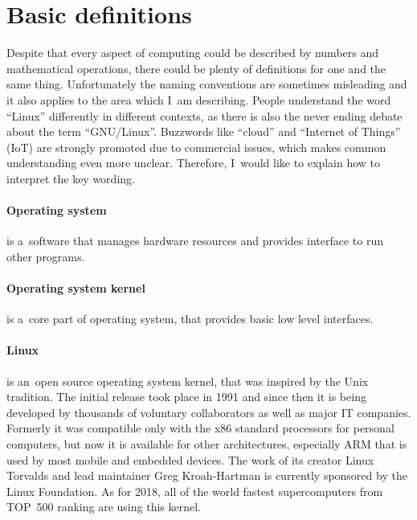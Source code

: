 \documentclass[printmode]{mgr}
\begin{document}
\section{Basic definitions}

Despite that every aspect of computing could be described by numbers and mathematical operations, there could be plenty of definitions for one and the same thing.
Unfortunately the naming conventions are sometimes misleading and it also applies to the area which I~am describing.
People understand the word ``Linux'' differently in different contexts, as there is also the never ending debate about the term ``GNU/Linux''.\cite{web:gnu-linux}
Buzzwords like ``cloud'' and ``Internet of Things'' (IoT) are strongly promoted due to commercial issues, which makes common understanding even more unclear.
Therefore, I~would like to explain how to interpret the key wording.

\paragraph{Operating system} is a~software that manages hardware resources and provides interface to run other programs.\cite{web:def-os}

\paragraph{Operating system kernel} is a~core part of operating system, that provides  basic low level interfaces.\cite{web:def-kernel}

\paragraph{Linux} is an~open source operating system kernel, that was inspired by the Unix tradition. The initial release took place in 1991 and since then it is being developed by thousands of voluntary collaborators as well as major IT companies. Formerly it was compatible only with the x86 standard processors for personal computers, but now it is available for other architectures, especially ARM that is used by most mobile and embedded devices. The work of its creator Linux Torvalds and lead maintainer Greg Kroah-Hartman is currently sponsored by the Linux Foundation. As for 2018, all of the world fastest supercomputers from TOP~500 ranking are using this kernel.
\end{document}
